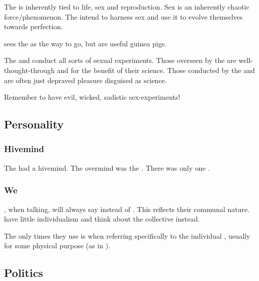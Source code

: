 The  is inherently tied to life, sex and reproduction. Sex is an inherently chaotic force/phenomenon. The \banes{} intend to harness sex and use it to evolve themselves towards perfection. 

\Daggerrain{} sees the  as the way to go, but \humans{} are useful guinea pigs. 

The \banes{} and \resphain{} conduct all sorts of sexual experiments. Those overseen by the \banelords{} are well-thought-through and for the benefit of their science. Those conducted by the \resphain{} and \resviel{} are often just depraved pleasure disguised as science. 

Remember to have evil, wicked, sadistic sex-experiments! 









\subsection{Personality}





\subsubsection{Hivemind}
The \banes had a hivemind. 
The overmind was the \baneking \Voidbringer.
There was only one \baneking. 





\subsubsection{We}
\Banelords, when talking, will always say  instead of . 
This reflects their communal nature. 
\Banelords{} have little individualism and think about the collective instead. 

The only times they use  is when referring specifically to the individual \banelord, usually for some physical purpose 
(as in ). 








\subsection{Politics}






